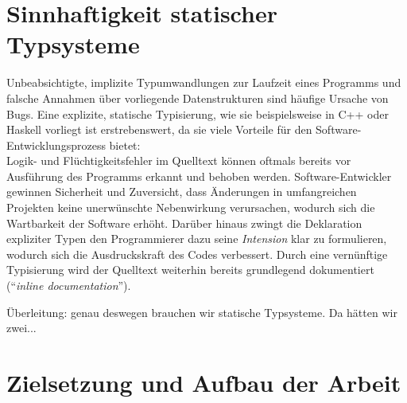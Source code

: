 


\section{Sinnhaftigkeit statischer Typsysteme}

Unbeabsichtigte, implizite Typumwandlungen zur Laufzeit eines Programms und falsche Annahmen über vorliegende Datenstrukturen sind häufige Ursache von Bugs. Eine explizite, statische Typisierung, wie sie beispielsweise in C++ oder Haskell vorliegt ist erstrebenswert, da sie viele Vorteile für den Software-Entwicklungsprozess bietet:\\
Logik- und Flüchtigkeitsfehler im Quelltext können oftmals bereits vor Ausführung des Programms erkannt und behoben werden. Software-Entwickler gewinnen Sicherheit und Zuversicht, dass Änderungen in umfangreichen Projekten keine unerwünschte Nebenwirkung verursachen, wodurch sich die Wartbarkeit der Software erhöht. Darüber hinaus zwingt die Deklaration expliziter Typen den Programmierer dazu seine \emph{Intension} klar zu formulieren, wodurch sich die Ausdruckskraft des Codes verbessert. Durch eine vernünftige Typisierung wird der Quelltext weiterhin bereits grundlegend dokumentiert (\enquote{\emph{inline documentation}}).


Überleitung: genau deswegen brauchen wir statische Typsysteme. Da hätten wir zwei...

\section{Zielsetzung und Aufbau der Arbeit}
